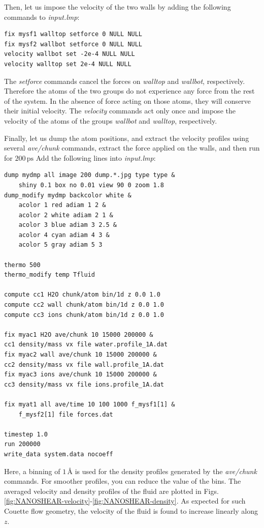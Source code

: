 \documentclass[9pt,tutorial]{livecoms}
\begin{document}
Then, let us impose the velocity of the two walls by adding the following
commands to \textit{input.lmp}:
{\normalsize \begin{verbatim}
fix mysf1 walltop setforce 0 NULL NULL
fix mysf2 wallbot setforce 0 NULL NULL
velocity wallbot set -2e-4 NULL NULL
velocity walltop set 2e-4 NULL NULL
\end{verbatim}}
The \textit{setforce} commands cancel the forces on \textit{walltop} and
\textit{wallbot}, respectively. Therefore the atoms of the two groups do not
experience any force from the rest of the system. In the absence of force acting
on those atoms, they will conserve their initial velocity. The \textit{velocity}
commands act only once and impose the velocity of the atoms of the groups
\textit{wallbot} and \textit{walltop}, respectively.

Finally, let us dump the atom positions, and extract the velocity profiles using
several \textit{ave/chunk} commands, extract the force applied on the walls, and
then run for $200\,\text{ps}$ Add the following lines into \textit{input.lmp}:
{\normalsize \begin{verbatim}
dump mydmp all image 200 dump.*.jpg type type &
    shiny 0.1 box no 0.01 view 90 0 zoom 1.8
dump_modify mydmp backcolor white &
    acolor 1 red adiam 1 2 &
    acolor 2 white adiam 2 1 &
    acolor 3 blue adiam 3 2.5 &
    acolor 4 cyan adiam 4 3 &
    acolor 5 gray adiam 5 3

thermo 500
thermo_modify temp Tfluid

compute cc1 H2O chunk/atom bin/1d z 0.0 1.0
compute cc2 wall chunk/atom bin/1d z 0.0 1.0
compute cc3 ions chunk/atom bin/1d z 0.0 1.0

fix myac1 H2O ave/chunk 10 15000 200000 &
cc1 density/mass vx file water.profile_1A.dat
fix myac2 wall ave/chunk 10 15000 200000 &
cc2 density/mass vx file wall.profile_1A.dat
fix myac3 ions ave/chunk 10 15000 200000 &
cc3 density/mass vx file ions.profile_1A.dat

fix myat1 all ave/time 10 100 1000 f_mysf1[1] &
    f_mysf2[1] file forces.dat

timestep 1.0
run 200000
write_data system.data nocoeff
\end{verbatim}}
Here, a binning of $1\,\text{\AA{}}$ is used for the density profiles generated
by the \textit{ave/chunk} commands. For smoother profiles, you can reduce the value
of the bins. The averaged velocity and density profiles of the fluid are plotted
in Figs.\ref{fig:NANOSHEAR-velocity}-\ref{fig:NANOSHEAR-density}. As expected for
such Couette flow geometry, the velocity of the fluid is found to increase linearly
along $z$.
\end{document}
